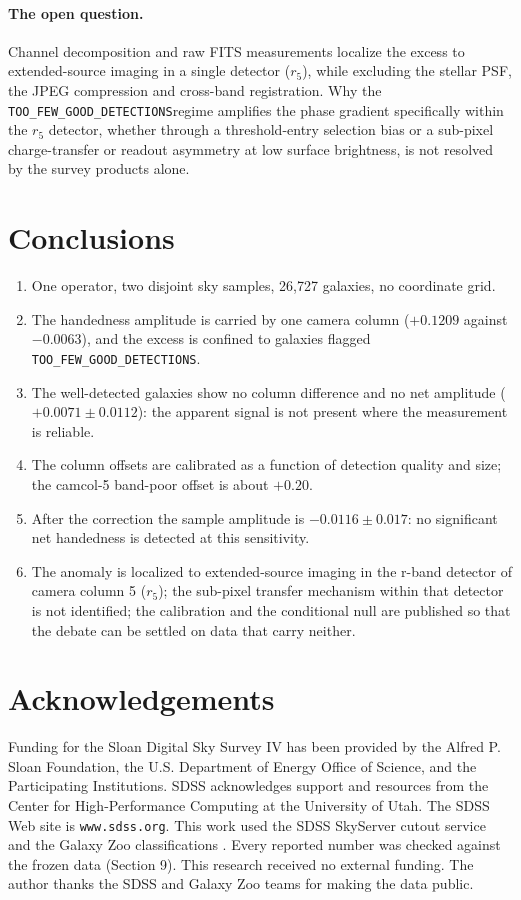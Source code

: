 \documentclass[11pt]{article}
\newcommand{\toofew}{\texttt{TOO\_\allowbreak FEW\_\allowbreak GOOD\_\allowbreak DETECTIONS}}
\begin{document}
\paragraph{The open question.} Channel decomposition and raw FITS measurements localize the excess
to extended-source imaging in a single detector ($r_5$), while excluding the stellar PSF, the JPEG
compression and cross-band registration. Why the \toofew regime amplifies
the phase gradient specifically within the $r_5$ detector, whether through a threshold-entry
selection bias or a sub-pixel charge-transfer or readout asymmetry at low surface brightness, is not
resolved by the survey products alone.

\section{Conclusions}
\begin{enumerate}
\item One operator, two disjoint sky samples, 26,727 galaxies, no coordinate grid.
\item The handedness amplitude is carried by one camera column ($+0.1209$ against $-0.0063$), and
the excess is confined to galaxies flagged \toofew.
\item The well-detected galaxies show no column difference and no net amplitude
($+0.0071 \pm 0.0112$): the apparent signal is not present where the measurement is reliable.
\item The column offsets are calibrated as a function of detection quality and size; the camcol-5
band-poor offset is about $+0.20$.
\item After the correction the sample amplitude is $-0.0116 \pm 0.017$: no significant net
handedness is detected at this sensitivity.
\item The anomaly is localized to extended-source imaging in the r-band detector of camera column 5
($r_5$); the sub-pixel transfer mechanism within that detector is not identified; the calibration
and the conditional null are published so that the debate can be settled on data that carry
neither.
\end{enumerate}

\section*{Acknowledgements}
Funding for the Sloan Digital Sky Survey IV has been provided by the Alfred P. Sloan Foundation, the
U.S. Department of Energy Office of Science, and the Participating Institutions. SDSS acknowledges
support and resources from the Center for High-Performance Computing at the University of Utah. The
SDSS Web site is \texttt{www.sdss.org}. This work used the SDSS SkyServer cutout service
\cite{sdssdr18} and the Galaxy Zoo classifications \cite{lintott2008, masters2021}. Every reported number was checked against the frozen data (Section 9). This research received no external funding. The author thanks the SDSS and Galaxy Zoo teams for making the data
public.
\end{document}
